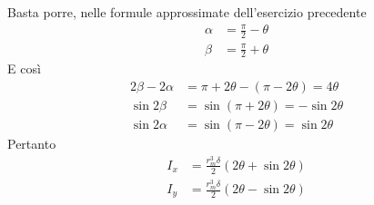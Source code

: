 \noindent Basta porre, nelle formule approssimate dell'esercizio precedente 
\begin{align*}
\alpha &= \frac{\pi}{2} - \theta \\ 
\beta &= \frac{\pi}{2} + \theta
\end{align*}
E così
\begin{align*}
2\beta-2\alpha &= \pi+2\theta-(\pi-2\theta) = 4\theta \\
\sin 2\beta &= \sin(\pi+2\theta) = -\sin 2\theta \\ 
\sin 2\alpha &= \sin(\pi-2\theta) = \sin 2\theta
\end{align*}
Pertanto
\begin{align*}
I_x &= \frac{r_{m}^{3}\delta}{2}(2\theta+\sin 2\theta) \\ 
I_y &= \frac{r_{m}^{3}\delta}{2}(2\theta-\sin 2\theta)
\end{align*}
